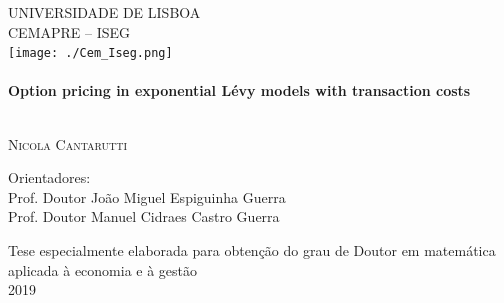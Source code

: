\begin{titlepage}
\begin{center}



\textsc{\Large UNIVERSIDADE DE LISBOA}\\[0.5cm]
\textsc{\Large CEMAPRE -- ISEG}\\[1cm]

\texttt{[image: ./Cem\_Iseg.png]}~\\[1cm]

\HRule \\[0.4cm]
{ \huge \bfseries Option pricing in exponential Lévy models with transaction costs \\[0.4cm] }

\HRule \\[1.5cm]


\textsc{\LARGE Nicola Cantarutti}\\[1.5cm]


\noindent
\begin{flushleft} \large
Orientadores:\\[0.2cm]
Prof. Doutor João Miguel Espiguinha Guerra\\
Prof. Doutor Manuel Cidraes Castro Guerra\\
\end{flushleft}


\vfill

{Tese especialmente elaborada para obtenção do grau de Doutor em matemática aplicada à economia e à gestão}\\[2cm]

{\large 2019}\\[0.3cm]

\end{center}
\end{titlepage}
